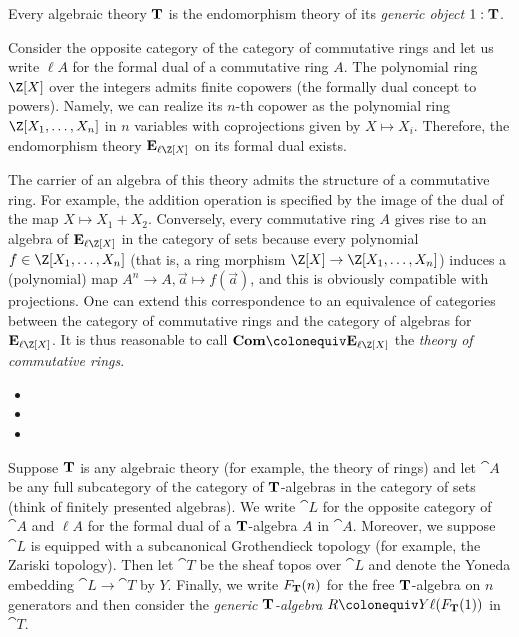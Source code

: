 {\begin{remark}
  Every algebraic theory \(\mathbf{T}\) is the endomorphism theory of its \emph{generic object} \(1:\mathbf{T}\).
\end{remark}

\begin{example}
  Consider the opposite category of the category of commutative rings and let us write \(\ell A\) for the formal dual of a commutative ring \(A\).
  The polynomial ring \(\Z[X]\) over the integers admits finite copowers (the formally dual concept to powers).
  Namely, we can realize its \(n\)-th copower as the polynomial ring \(\Z[X_1,\dots,X_n]\) in \(n\) variables with coprojections given by \(X\mapsto X_i\).
  Therefore, the endomorphism theory \(\EE_{\ell\Z[X]}\) on its formal dual exists.

  The carrier of an algebra of this theory admits the structure of a commutative ring.
  For example, the addition operation is specified by the image of the dual of the map \(X\mapsto X_1+X_2\).
  Conversely, every commutative ring \(A\) gives rise to an algebra of \(\EE_{\ell\Z[X]}\) in the category of sets because every polynomial \(f\in\Z[X_1,\dots,X_n]\) (that is, a ring morphism \(\Z[X]\to\Z[X_1,\dots,X_n]\)) induces a (polynomial) map \(A^n\to A, \vec{a}\mapsto f(\vec{a})\), and this is obviously compatible with projections.
  One can extend this correspondence to an equivalence of categories between the category of commutative rings and the category of algebras for \(\EE_{\ell\Z[X]}\).
  It is thus reasonable to call \(\Com\colonequiv\EE_{\ell\Z[X]}\) the \emph{theory of commutative rings}.
\end{example}

\begin{itemize}
  \item{}
  \item{}
  \item{}
\end{itemize}

Suppose \(\mathbf{T}\) is any algebraic theory (for example, the theory of rings) and let \(\cat A\) be any full subcategory of the category of \(\mathbf{T}\)-algebras in the category of sets (think of finitely presented algebras).
We write \(\cat L\) for the opposite category of \(\cat A\) and \(\ell A\) for the formal dual of a \(\mathbf{T}\)-algebra \(A\) in \(\cat A\).
Moreover, we suppose \(\cat L\) is equipped with a subcanonical Grothendieck topology (for example, the Zariski topology).
Then let \(\cat T\) be the sheaf topos over \(\cat L\) and denote the Yoneda embedding \(\cat L\to\cat T\) by \(Y\).
Finally, we write \(F_{\mathbf{T}}(n)\) for the free \(\mathbf{T}\)-algebra on \(n\) generators and then consider the \emph{generic \(\mathbf{T}\)-algebra} \(R\colonequiv Y\ell(F_{\TT}(1))\) in \(\cat T\).

}
